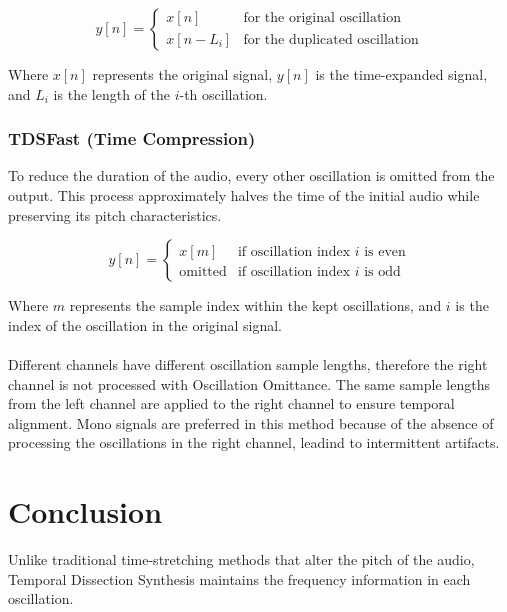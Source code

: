 \documentclass[12pt,a4paper]{article}
\begin{document}
\begin{center}
\end{center}
\begin{equation*}
y[n] = \begin{cases}
x[n] & \text{for the original oscillation} \\
x[n - L_i] & \text{for the duplicated oscillation}
\end{cases}
\end{equation*}

Where $x[n]$ represents the original signal, $y[n]$ is the time-expanded signal, and $L_i$ is the length of the $i$-th oscillation.

\subsubsection{TDSFast (Time Compression)}
To reduce the duration of the audio, every other oscillation is omitted from the output. This process approximately halves the time of the initial audio while preserving its pitch characteristics.

\begin{center}
\end{center}
\begin{equation*}
y[n] = \begin{cases}
x[m] & \text{if oscillation index } i \text{ is even} \\
\text{omitted} & \text{if oscillation index } i \text{ is odd}
\end{cases}
\end{equation*}

Where $m$ represents the sample index within the kept oscillations, and $i$ is the index of the oscillation in the original signal.\\\\
Different channels have different oscillation sample lengths, therefore the right channel is not processed with Oscillation Omittance. The same sample lengths from the left channel are applied to the right channel to ensure temporal alignment. Mono signals are preferred in this method because of the absence of processing the oscillations in the right channel, leadind to intermittent artifacts.

\section{Conclusion}
Unlike traditional time-stretching methods that alter the pitch of the audio, Temporal Dissection Synthesis maintains the frequency information in each oscillation.
\end{document}
